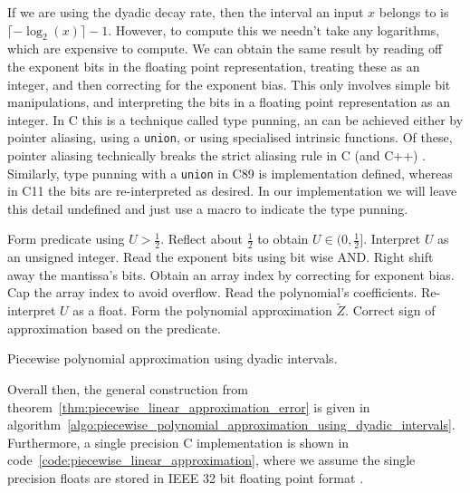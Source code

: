 \documentclass[manuscript,review]{acmart}
\begin{document}
If we are using the dyadic decay rate, then the interval an input $ x $  belongs to is $ \lceil -{\log}_2(x) \rceil - 1 $. However, to compute this we needn't take any logarithms, which are expensive to compute. We can obtain the same result by reading off the exponent bits in the floating point representation, treating these as an integer, and then correcting for the exponent bias.  This only involves simple bit manipulations, and interpreting the bits in a floating point representation as an integer. In C this is a technique called type punning, an can be achieved either by pointer aliasing, using a \texttt{union}, or using specialised intrinsic functions. Of these, pointer aliasing technically breaks the strict aliasing rule in C (and C++) \citep[6.5.2.3]{iso2012c11} \citep[pages~163--164]{stallman2020gcc}. Similarly, type punning with a \texttt{union} in C89 is implementation defined, whereas in C11 the bits are re-interpreted as desired. In our implementation we will leave this detail undefined and just use a macro to indicate the type punning. 

\begin{algorithm}[h!tb]
\DontPrintSemicolon
{}
Form predicate using $ U > \tfrac{1}{2} $.\;
Reflect about $ \tfrac{1}{2} $ to obtain $ U \in (0, \tfrac{1}{2}] $.\;
Interpret $ U $ as an unsigned integer.\;
Read the exponent bits using bit wise AND.\;
Right shift away the mantissa's bits.\;
Obtain an array index by correcting for exponent bias.\;
Cap the array index to avoid overflow.\;
Read the polynomial's coefficients.\;
Re-interpret $ U $ as a float.\;
Form the polynomial approximation $ \tilde{Z} $.\;
Correct sign of approximation based on the predicate.\;
\caption{Piecewise polynomial approximation using dyadic intervals.}
\label{algo:piecewise_polynomial_approximation_using_dyadic_intervals}
\end{algorithm}

Overall then, the general construction from theorem~\ref{thm:piecewise_linear_approximation_error} is given in algorithm~\ref{algo:piecewise_polynomial_approximation_using_dyadic_intervals}. Furthermore, a single precision C implementation is shown in code~\ref{code:piecewise_linear_approximation}, where we assume the single precision floats are stored in IEEE 32 bit floating point format \citep{ieee2008ieee}. 
\end{document}
